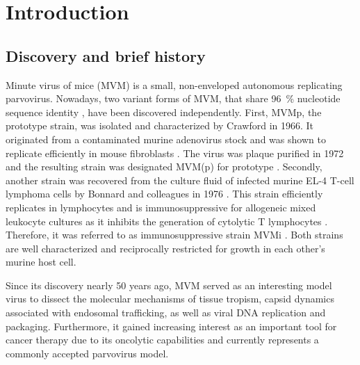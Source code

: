 
\chapter{Introduction} %

\label{Chapter1} %


\graphicspath{{./Pictures/}}

\section{Discovery and brief history}
\label{sec:Discovery and brief history}
Minute virus of mice (MVM) is a small, non-enveloped autonomous replicating parvovirus. Nowadays, two variant forms of MVM, that share 96~\% nucleotide sequence identity \cite{pmid3855242}, have been discovered independently. 
First, MVMp, the prototype strain, was isolated and characterized by Crawford in 1966. It originated from a contaminated murine adenovirus stock and was shown to replicate efficiently in mouse fibroblasts \cite{pmid5945715}. The virus was plaque purified in 1972 \cite{pmid4673484} and the resulting strain was designated MVM(p) for prototype \cite{MVMp}. Secondly, another strain was recovered from the culture fluid of infected murine EL-4 T-cell lymphoma cells by Bonnard and colleagues in 1976 \cite{pmid1244418}. This strain efficiently replicates in lymphocytes and is immunosuppressive for allogeneic mixed leukocyte cultures as it inhibits the generation of cytolytic T lymphocytes \cite{pmid6457871}. Therefore, it was referred to as immunosuppressive strain MVMi \cite{pmid6264106}. Both strains are well characterized and reciprocally restricted for growth in each other’s murine host cell.  

Since its discovery nearly 50 years ago, MVM served as an interesting model virus to dissect the molecular mechanisms of tissue tropism, capsid dynamics associated with endosomal trafficking, as well as viral DNA replication and packaging. Furthermore, it gained increasing interest as an important tool for cancer therapy due to its oncolytic capabilities and currently represents a commonly accepted parvovirus model.     


